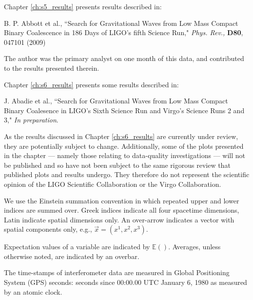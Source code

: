 \documentclass[12pt,notitlepage]{report}
\begin{document}
\vspace*{0.5cm}

\noindent Chapter \ref{ch:s5_results} presents results described in:

\vspace*{0.25cm}
\noindent B. P. Abbott et al., ``Search for Gravitational Waves from Low Mass Compact Binary Coalescence in 186 Days of LIGO's fifth Science Run," {\it Phys. Rev.,} {\bf D80}, 047101 (2009)

\vspace*{0.25cm}
\noindent The author was the primary analyst on one month of this data, and contributed to the results presented therein.

\vspace*{0.5cm}
\noindent Chapter \ref{ch:s6_results} presents some results described in:

\vspace*{0.25cm}
\noindent J. Abadie et al., ``Search for Gravitational Waves from Low Mass Compact Binary Coalesence in LIGO's Sixth Science Run and Virgo's Science Runs 2 and 3," {\it In preparation}.

\vspace*{0.25cm}
\noindent As the results discussed in Chapter \ref{ch:s6_results} are currently under review, they are potentially subject to change. Additionally, some of the plots presented in the chapter --- namely those relating to data-quality investigations --- will not be published and so have not been subject to the same rigorous review that published plots and results undergo. They therefore do not represent the scientific opinion of the LIGO Scientific Collaboration or the Virgo Collaboration.


We use the Einstein summation convention in which repeated upper and lower
indices are summed over. Greek indices indicate all four spacetime dimensions,
Latin indicate spatial dimensions only. An over-arrow indicates a vector with
spatial components only, e.g., $\vec{x} = (x^1,x^2,x^3)$.

\vspace{0.5cm}

\noindent Expectation values of a variable are indicated by $\mathbb{E}()$.
Averages, unless otherwise noted, are indicated by an overbar.

\vspace{0.5cm}

\noindent The time-stamps of interferometer data are measured in
Global Positioning System (GPS) seconds: seconds since 00:00.00 UTC
January 6, 1980 as measured by an atomic clock.
\end{document}
